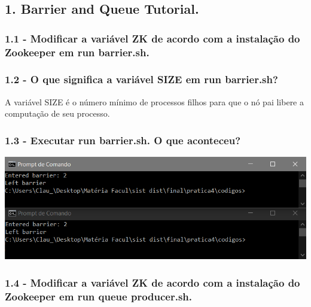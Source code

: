 \subsection*{1. Barrier and Queue Tutorial.}

\subsubsection{1.1 - Modificar a variável ZK de acordo com a instalação do Zookeeper em run barrier.sh.}

\vspace{-0.5em}
\begin{minipage}{\textwidth}
  \hspace{-1em}
  \centering
  
  \label{prog1}
  \hspace{1em}
\end{minipage}
\vspace{0.5em}

\subsubsection{1.2 - O que significa a variável SIZE em run barrier.sh?}
A variável SIZE é o número mínimo de processos filhos para que o nó pai libere a computação de seu processo.

\subsubsection{1.3 - Executar run barrier.sh. O que aconteceu?}
\includegraphics{pratica4/prints/roteiro 1.3.PNG}

\subsubsection{1.4 - Modificar a variável ZK de acordo com a instalação do Zookeeper em
run queue producer.sh.}


